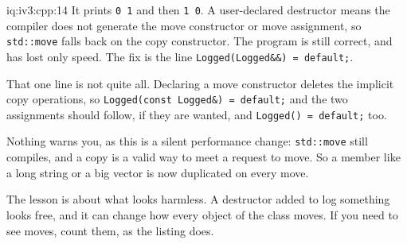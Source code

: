 \begin{solution}{iq:iv3:cpp:14}
It prints \texttt{0 1} and then \texttt{1 0}. A user-declared destructor means the compiler does not generate the move constructor or move assignment, so \texttt{std::move} falls back on the copy constructor. The program is still correct, and has lost only speed. The fix is the line \texttt{Logged(Logged\&\&) = default;}.

That one line is not quite all. Declaring a move constructor deletes the implicit copy operations, so \texttt{Logged(const Logged\&) = default;} and the two assignments should follow, if they are wanted, and \texttt{Logged() = default;} too.

Nothing warns you, as this is a silent performance change: \texttt{std::move} still compiles, and a copy is a valid way to meet a request to move. So a member like a long string or a big vector is now duplicated on every move.

The lesson is about what looks harmless. A destructor added to log something looks free, and it can change how every object of the class moves. If you need to see moves, count them, as the listing does.

\end{solution}


